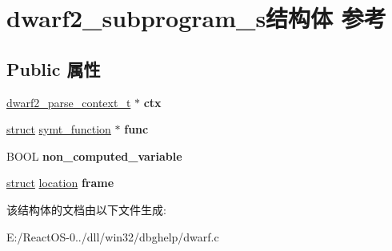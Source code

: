 \hypertarget{structdwarf2__subprogram__s}{}\section{dwarf2\+\_\+subprogram\+\_\+s结构体 参考}
\label{structdwarf2__subprogram__s}
\subsection*{Public 属性}
\begin{DoxyCompactItemize}
\item 
\mbox{\label{structdwarf2__subprogram__s_ab2c4bd02f57a269f4996533e470117ba}} 
\hyperlink{structdwarf2__parse__context__s}{dwarf2\+\_\+parse\+\_\+context\+\_\+t} $\ast$ {\bfseries ctx}
\item 
\mbox{\label{structdwarf2__subprogram__s_ac29325645f98d4e7651cfc542de5b9a7}} 
\hyperlink{interfacestruct}{struct} \hyperlink{structsymt__function}{symt\+\_\+function} $\ast$ {\bfseries func}
\item 
\mbox{\label{structdwarf2__subprogram__s_a28757c3229474869974227cdc09cec54}} 
B\+O\+OL {\bfseries non\+\_\+computed\+\_\+variable}
\item 
\mbox{\label{structdwarf2__subprogram__s_a6a28099f342037ad9295f97c4f326ce6}} 
\hyperlink{interfacestruct}{struct} \hyperlink{structlocation}{location} {\bfseries frame}
\end{DoxyCompactItemize}


该结构体的文档由以下文件生成\+:\begin{DoxyCompactItemize}
\item 
E\+:/\+React\+O\+S-\/0../dll/win32/dbghelp/dwarf.\+c\end{DoxyCompactItemize}
